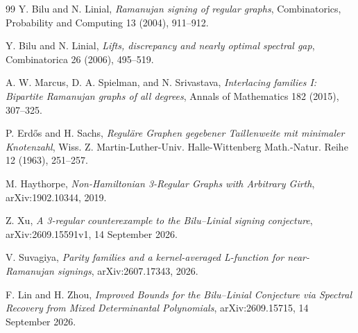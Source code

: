\documentclass[11pt]{article}
\begin{document}
\begin{thebibliography}{99}
Y. Bilu and N. Linial,
\emph{Ramanujan signing of regular graphs},
Combinatorics, Probability and Computing 13 (2004), 911--912.

Y. Bilu and N. Linial,
\emph{Lifts, discrepancy and nearly optimal spectral gap},
Combinatorica 26 (2006), 495--519.

A. W. Marcus, D. A. Spielman, and N. Srivastava,
\emph{Interlacing families I: Bipartite Ramanujan graphs of all degrees},
Annals of Mathematics 182 (2015), 307--325.

P. Erd\H{o}s and H. Sachs,
\emph{Regul\"are Graphen gegebener Taillenweite mit minimaler Knotenzahl},
Wiss. Z. Martin-Luther-Univ. Halle-Wittenberg Math.-Natur. Reihe 12 (1963), 251--257.

M. Haythorpe,
\emph{Non-Hamiltonian 3-Regular Graphs with Arbitrary Girth},
arXiv:1902.10344, 2019.

Z. Xu,
\emph{A 3-regular counterexample to the Bilu--Linial signing conjecture},
arXiv:2609.15591v1, 14 September 2026.

V. Suvagiya,
\emph{Parity families and a kernel-averaged L-function for near-Ramanujan signings},
arXiv:2607.17343, 2026.

F. Lin and H. Zhou,
\emph{Improved Bounds for the Bilu--Linial Conjecture via Spectral Recovery from Mixed Determinantal Polynomials},
arXiv:2609.15715, 14 September 2026.
\end{thebibliography}
\end{document}
